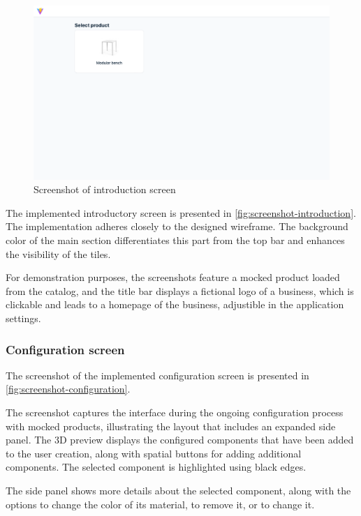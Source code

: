 \begin{figure}[h]
\centering
\includegraphics[width=\textwidth]{images/screenshot_introduction.png}
\caption{Screenshot of introduction screen}
\label{fig:screenshot-introduction}
\end{figure}

The implemented introductory screen is presented in \autoref{fig:screenshot-introduction}. The implementation adheres closely to the designed wireframe. The background color of the main section differentiates this part from the top bar and enhances the visibility of the tiles.

For demonstration purposes, the screenshots feature a mocked product loaded from the catalog, and the title bar displays a fictional logo of a business, which is clickable and leads to a homepage of the business, adjustible in the application settings.  

\subsubsection{Configuration screen}

The screenshot of the implemented configuration screen is presented in \autoref{fig:screenshot-configuration}.

The screenshot captures the interface during the ongoing configuration process with mocked products, illustrating the layout that includes an expanded side panel. The 3D preview displays the configured components that have been added to the user creation, along with spatial buttons for adding additional components. The selected component is highlighted using black edges.

The side panel shows more details about the selected component, along with the options to change the color of its material, to remove it, or to change it.

